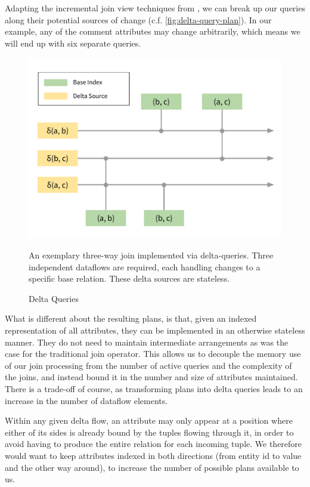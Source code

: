 \documentclass[../catalog.tex]{subfiles}
\begin{document}
Adapting the incremental join view techniques from
\cite{blakeley1986efficiently}, we can break up our queries along
their potential sources of change
(c.f. \autoref{fig:delta-query-plan}). In our example, any of the
comment attributes may change arbitrarily, which means we will end up
with six separate queries.

\begin{figure}[h!]
  \includegraphics[width=1.0\linewidth]{diagrams/delta-queries}
  \caption{Delta Queries}
  \label{fig:delta-query-plan}

  \medskip
  \small
  
  An exemplary three-way join implemented via delta-queries. Three
  independent dataflows are required, each handling changes to a
  specific base relation. These delta sources are stateless.
\end{figure}

What is different about the resulting plans, is that, given an indexed
representation of all attributes, they can be implemented in an
otherwise stateless manner. They do not need to maintain intermediate
arrangements as was the case for the traditional join operator. This
allows us to decouple the memory use of our join processing from the
number of active queries and the complexity of the joins, and instead
bound it in the number and size of attributes maintained. There is a
trade-off of course, as transforming plans into delta queries leads to
an increase in the number of dataflow elements.

Within any given delta flow, an attribute may only appear at a
position where either of its sides is already bound by the tuples
flowing through it, in order to avoid having to produce the entire
relation for each incoming tuple. We therefore would want to keep
attributes indexed in both directions (from entity id to value and the
other way around), to increase the number of possible plans available
to us.
\end{document}
